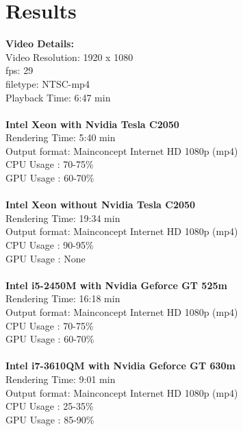 \section{Results}
\textbf{Video Details:}\\
	Video Resolution: 1920 x 1080\\
	fps: 29\\
	filetype: NTSC-mp4\\
	Playback Time: 6:47 min\\\\
\textbf{Intel Xeon with Nvidia Tesla C2050}\\
	Rendering Time: 5:40 min\\
	Output format: Mainconcept Internet HD 1080p (mp4)\\
	CPU Usage : 70-75\%\\
	GPU Usage : 60-70\%\\\\
\textbf{Intel Xeon without Nvidia Tesla C2050}\\
	Rendering Time: 19:34 min\\
	Output format: Mainconcept Internet HD 1080p (mp4)\\
	CPU Usage : 90-95\%\\
	GPU Usage : None\\\\
\textbf{Intel i5-2450M with Nvidia Geforce GT 525m}\\ 
	Rendering Time: 16:18 min\\
	Output format: Mainconcept Internet HD 1080p (mp4)\\
	CPU Usage : 70-75\%\\
	GPU Usage : 60-70\%\\\\
\textbf{Intel i7-3610QM with Nvidia Geforce GT 630m}\\ 
	Rendering Time:  9:01 min\\
	Output format: Mainconcept Internet HD 1080p (mp4)\\
	CPU Usage : 25-35\%\\
	GPU Usage : 85-90\%\\\\\\

\newpage
